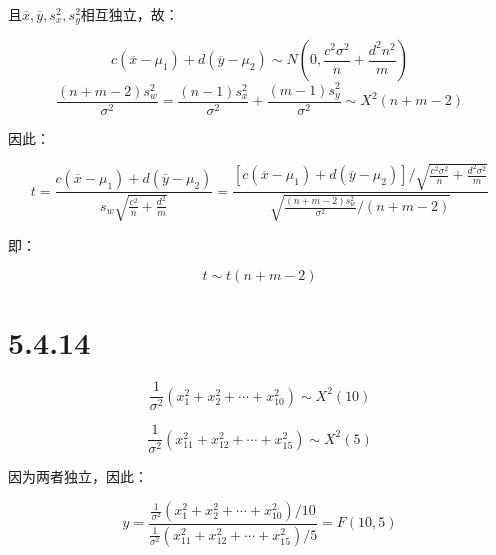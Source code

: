 \documentclass{article}
\begin{document}
且$\overline x, \overline y, s_x^2, s_y^2$相互独立，故：

$$c(\overline x-\mu_1)+d(\overline y-\mu_2)\sim N(0,\frac{c^2\sigma^2}{n}+\frac{d^2n^2}{m})$$
$$\frac{(n+m-2)s_w^2}{\sigma^2}=\frac{(n-1)s^2_x}{\sigma^2}+\frac{(m-1)s_y^2}{\sigma^2}\sim X^2(n+m-2)$$

因此：

$$t=\frac{c(\overline x-\mu_1)+d(\overline y-\mu_2)}{s_w\sqrt{\frac{c^2}{n}+\frac{d^2}{m}}}=\frac{[c(\overline x-\mu_1)+d(\overline y-\mu_2)]/\sqrt{\frac{c^2\sigma^2}{n}+\frac{d^2\sigma^2}{m}}}{\sqrt{\frac{(n+m-2)s_w^2}{\sigma^2}/(n+m-2)}}$$

即：

$$t\sim t(n+m-2)$$



\section{5.4.14}

$$\frac 1 {\sigma^2}(x_1^2+x_2^2+\cdots+x_{10}^2)\sim X^2(10)$$

$$\frac 1 {\sigma^2}(x_{11}^2+x_{12}^2+\cdots+x_{15}^2)\sim X^2(5)$$

因为两者独立，因此：

$$y=\frac{\frac 1 {\sigma^2}(x_1^2+x_2^2+\cdots+x_{10}^2)/10}{\frac 1 {\sigma^2}(x_{11}^2+x_{12}^2+\cdots+x_{15}^2)/5}=F(10,5)$$
\end{document}
